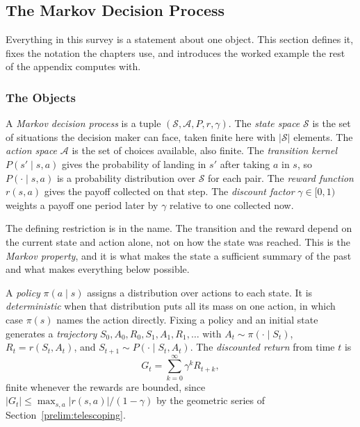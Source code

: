 \subsection{The Markov Decision Process}
\label{prelim:mdp}
\label{engine:model}

Everything in this survey is a statement about one object. This section defines it, fixes the notation the chapters use, and introduces the worked example the rest of the appendix computes with.

\subsubsection{The Objects}

A \emph{Markov decision process} is a tuple $(\mathcal{S}, \mathcal{A}, P, r, \gamma)$. The \emph{state space} $\mathcal{S}$ is the set of situations the decision maker can face, taken finite here with $|\mathcal{S}|$ elements. The \emph{action space} $\mathcal{A}$ is the set of choices available, also finite. The \emph{transition kernel} $P(s' \mid s, a)$ gives the probability of landing in $s'$ after taking $a$ in $s$, so $P(\cdot \mid s,a)$ is a probability distribution over $\mathcal{S}$ for each pair. The \emph{reward function} $r(s,a)$ gives the payoff collected on that step. The \emph{discount factor} $\gamma \in [0,1)$ weights a payoff one period later by $\gamma$ relative to one collected now.

The defining restriction is in the name. The transition and the reward depend on the current state and action alone, not on how the state was reached. This is the \emph{Markov property}, and it is what makes the state a sufficient summary of the past and what makes everything below possible.

A \emph{policy} $\pi(a \mid s)$ assigns a distribution over actions to each state. It is \emph{deterministic} when that distribution puts all its mass on one action, in which case $\pi(s)$ names the action directly. Fixing a policy and an initial state generates a \emph{trajectory} $S_0, A_0, R_0, S_1, A_1, R_1, \ldots$ with $A_t \sim \pi(\cdot \mid S_t)$, $R_t = r(S_t, A_t)$, and $S_{t+1} \sim P(\cdot \mid S_t, A_t)$. The \emph{discounted return} from time $t$ is
\begin{equation}
G_t = \sum_{k=0}^{\infty} \gamma^k R_{t+k},
\label{eq:prelim_return}
\end{equation}
finite whenever the rewards are bounded, since $|G_t| \leq \max_{s,a}|r(s,a)| / (1-\gamma)$ by the geometric series of Section~\ref{prelim:telescoping}.

